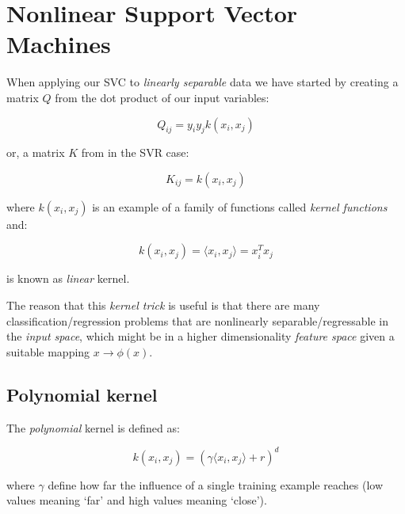 \section{Nonlinear Support Vector Machines}

When applying our SVC to \emph{linearly separable} data we have started by creating a matrix $Q$ from the dot product of our input variables:

\begin{equation} \label{eq:svc_hessian}
	Q_{ij}=y_i y_j 	k(x_i,x_j)
\end{equation}

or, a matrix $K$ from in the SVR case:

\begin{equation} \label{eq:svr_hessian}
	K_{ij}=k(x_i,x_j)
\end{equation}

where $k(x_i,x_j)$ is an example of a family of functions called \emph{kernel functions} and:  

\begin{equation} \label{eq:kernel_function}
	k(x_i,x_j)=\langle x_i, x_j \rangle= x_i^T x_j
\end{equation}

is known as \emph{linear} kernel.

The reason that this \emph{kernel trick} is useful is that there are many classification/regression problems that are nonlinearly separable/regressable in the \emph{input space}, which might be in a higher dimensionality \emph{feature space} given a suitable mapping $x \rightarrow \phi(x)$.

\subsection{Polynomial kernel}

The \emph{polynomial} kernel is defined as:

\begin{equation} \label{eq:poly_kernel}
	k(x_i,x_j)=(\gamma \langle x_i, x_j\rangle + r)^d
\end{equation}

where $\gamma$ define how far the influence of a single training example reaches (low values meaning ‘far’ and high values meaning ‘close’).

